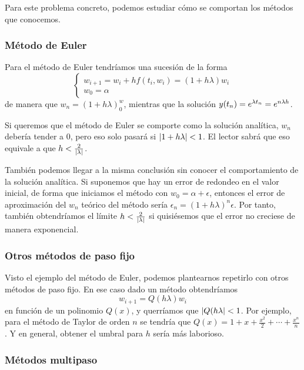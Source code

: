 Para este problema concreto,
podemos estudiar cómo se comportan los métodos que conocemos.

\subsubsection{Método de Euler}

Para el método de Euler tendríamos una sucesión de la forma
\begin{equation*}
    \begin{cases}
        w_{i+1} = w_i + hf(t_i, w_i) = (1 + h\lambda)w_i \\
        w_0 = \alpha
    \end{cases}
\end{equation*}
de manera que $w_n = (1 + h\lambda)^w_0$,
mientras que la solución $y(t_n) = e^{\lambda t_n} = e^{n\lambda h}$.

Si queremos que el método de Euler se comporte como la solución analítica,
$w_n$ debería tender a $0$,
pero eso solo pasará si $\abs{1 + h\lambda} < 1$.
El lector sabrá que eso equivale a que $h < \frac{2}{\abs{\lambda}}$.

También podemos llegar a la misma conclusión
sin conocer el comportamiento de la solución analítica.
Si suponemos que hay un error de redondeo en el valor inicial,
de forma que iniciamos el método con $w_0 = \alpha + \epsilon$,
entonces el error de aproximación del $w_n$ teórico del método sería
$\epsilon_n = (1 + h\lambda)^n\epsilon$.
Por tanto, también obtendríamos el límite $h < \frac{2}{\abs{\lambda}}$
si quisiésemos que el error no creciese de manera exponencial.

\subsubsection{Otros métodos de paso fijo}

Visto el ejemplo del método de Euler,
podemos plantearnos repetirlo con otros métodos de paso fijo.
En ese caso dado un método obtendríamos
\begin{equation}\label{eqn:polq-one-step}
    w_{i+1} = Q(h\lambda)w_i
\end{equation}
en función de un polinomio $Q(x)$,
y querríamos que $\abs{Q(h\lambda} < 1$.
Por ejemplo, para el método de Taylor de orden $n$ se tendría que
$Q(x) = 1 + x + \frac{x^2}{2} + \cdots + \frac{x^n}{n}$.
Y en general, obtener el umbral para $h$ sería más laborioso.

\subsubsection{Métodos multipaso}

